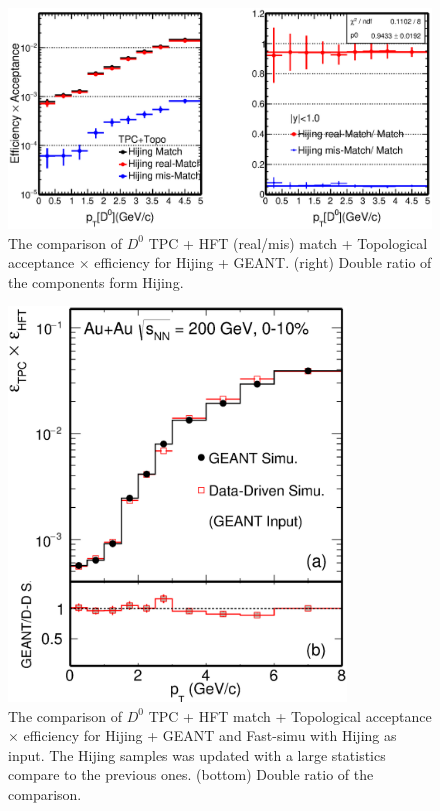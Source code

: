 \begin{figure}[htbp]
\centering
\includegraphics[keepaspectratio,width=1.0\textwidth,angle=0]{figure/Run14_D0HFT/ALL_Physics_FastHijingVsPureHijing_HFTTopo.eps}
\caption{The comparison of $D^0$ TPC + HFT (real/mis) match + Topological acceptance $\times$ efficiency for Hijing + GEANT. (right) Double ratio of the components form Hijing.}
\label{d0hfttopoAlleff}
\end{figure}

\begin{figure}[htbp]
\centering
\includegraphics[keepaspectratio,width=0.8\textwidth,angle=0]{figure/Run14_D0HFT/Mcd0Eff_0_10.eps}
\caption{The comparison of $D^0$ TPC + HFT match + Topological acceptance $\times$ efficiency for Hijing + GEANT and Fast-simu with Hijing as input. The Hijing samples was updated with a large statistics compare to the previous ones. (bottom) Double ratio of the comparison.}
\label{d0hfttopoeff_hijing_0_10}
\end{figure}


